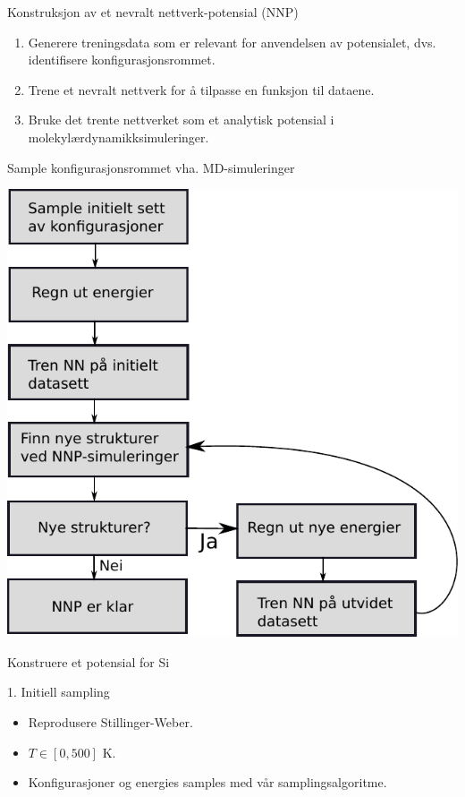 \documentclass{beamer}
\begin{document}
\begin{frame}

\begin{block}{Konstruksjon av et nevralt nettverk-potensial (NNP)}
 \begin{enumerate}
  \item Generere treningsdata som er relevant for anvendelsen av potensialet, dvs. identifisere konfigurasjonsrommet. 
  \item Trene et nevralt nettverk for å tilpasse en funksjon til dataene. 
  \item Bruke det trente nettverket som et analytisk potensial i molekylærdynamikksimuleringer. 
 \end{enumerate}
\end{block}

\end{frame}


\begin{frame}{Sample konfigurasjonsrommet vha. MD-simuleringer}
 
\centering
\includegraphics[width=0.7\linewidth]{../Figures/Presentation/iterativeSampling.pdf} 

\end{frame}


\begin{frame}{Konstruere et potensial for Si}

\begin{block}{1. Initiell sampling}
 \begin{itemize}
  \item Reprodusere Stillinger-Weber. 
  \item $T \in [0,500]$ K. 
  \item Konfigurasjoner og energies samples med vår samplingsalgoritme.  
 \end{itemize}
\end{block}

\end{frame}
\end{document}
